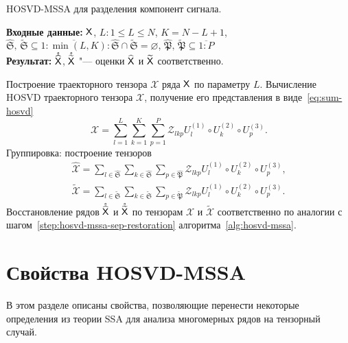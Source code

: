 \documentclass[specialist,
    substylefile = spbu_report.rtx,
    subf,href,colorlinks=true, 12pt]{disser}
\theoremstyle{plain}
\theoremstyle{definition}
\theoremstyle{remark}
\newcommand{\Input}{\textbf{Входные данные: }}
\newcommand{\Output}{\textbf{Результат: }}
\begin{document}
    \begin{algorithm}[!ht]
        \caption{HOSVD-MSSA для разделения компонент сигнала.}
        \label{alg:hosvd-mssa-sep}
        \Input $\mathsf{X}$,
        $L: 1\leqslant L \leqslant N$, $K = N - L + 1$, 
        $\widehat{\mathfrak{S}},\, \widetilde{\mathfrak{S}} \subseteq \overline{1:\min(L, K)}: 
        \widehat{\mathfrak{S}} \cap \widetilde{\mathfrak{S}} = \varnothing$,
        $\widehat{\mathfrak{P}},\, \widetilde{\mathfrak{P}}  \subseteq \overline{1:P}$\\
        \Output $\mathring{\widehat{\mathsf{X}}}$, $\mathring{\widetilde{\mathsf{X}}}$ "--- оценки $\widehat{\mathsf{X}}$ и $\widetilde{\mathsf{X}}$
        соответственно.\\
        \begin{algorithmic}[1]
            \State 
            Построение траекторного тензора $\mathcal{X}$ ряда $\mathsf{X}$ по параметру $L$.
            \State 
            Вычисление HOSVD траекторного тензора $\mathcal{X}$, получение его представления в виде~\eqref{eq:sum-hosvd}
            \begin{equation*}
                \mathcal{X}=\sum_{l=1}^{L} \sum_{k=1}^{K} \sum_{p=1}^{P} \mathcal{Z}_{lkp} U^{(1)}_{l}
                \circ U^{(2)}_{k} \circ U^{(3)}_{p}.
            \end{equation*}
            \State Группировка: построение тензоров
            \begin{gather*}
                \widehat{\mathcal{X}}=\sum_{l \in \widehat{\mathfrak{S}}} \sum_{k\in \widehat{\mathfrak{S}}}
                \sum_{p\in \widehat{\mathfrak{P}}}
                \mathcal{Z}_{lkp} U^{(1)}_{l}\circ U^{(2)}_{k} \circ U^{(3)}_{p},\\
                \widetilde{\mathcal{X}}=\sum_{l \in \widetilde{\mathfrak{S}}} \sum_{k\in \widetilde{\mathfrak{S}}}
                \sum_{p\in \widetilde{\mathfrak{P}}}
                \mathcal{Z}_{lkp} U^{(1)}_{l}\circ U^{(2)}_{k} \circ U^{(3)}_{p}.
            \end{gather*}
            \State Восстановление рядов $\mathring{\widehat{\mathsf{X}}}$ и $\mathring{\widetilde{\mathsf{X}}}$ по тензорам $\widehat{\mathcal{X}}$ и $\widetilde{\mathcal{X}}$ соответственно по аналогии с шагом~\ref{step:hosvd-mssa-sep-restoration} алгоритма~\ref{alg:hosvd-mssa}.
        \end{algorithmic}
    \end{algorithm}
    

    \section{Свойства HOSVD-MSSA}\label{sec:hosvd-mssa-properties}
    В этом разделе описаны свойства, позволяющие перенести некоторые определения из теории SSA для анализа многомерных
    рядов на тензорный случай.
    
\end{document}
